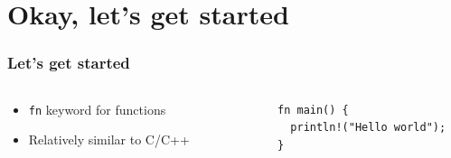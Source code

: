 \documentclass[aspectratio=169]{beamer}
\begin{document}
\section{Okay, let's get started}
\frame{\sectionpage}

\begin{frame}[fragile]
  \frametitle{Let's get started}

  \begin{columns}
    \begin{column}{.5\linewidth}
      \begin{itemize}
      \item \texttt{fn} keyword for functions
      \item Relatively similar to C/C++
      \end{itemize}
    \end{column}

    \begin{column}{.5\linewidth}
      \begin{verbatim}
        fn main() {
          println!("Hello world");
        }
      \end{verbatim}
    \end{column}
  \end{columns}
\end{frame}
\end{document}
